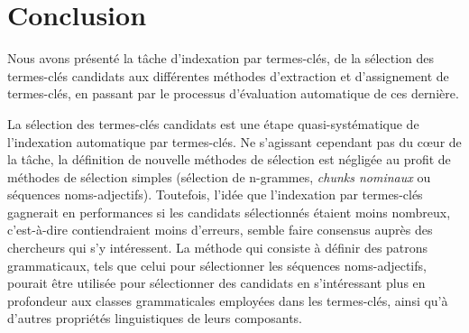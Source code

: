 


  \section{Conclusion}
  \label{sec:main-state_of_the_art-automatic_evaluation_of_keyphrase_annotation-conclusion}
    Nous avons présenté la tâche d'indexation par termes-clés, de la sélection
    des termes-clés candidats aux différentes méthodes d'extraction et
    d'assignement de termes-clés, en passant par le processus d'évaluation
    automatique de ces dernière.

    La sélection des termes-clés candidats est une étape quasi-systématique de
    l'indexation automatique par termes-clés. Ne s'agissant cependant pas du
    c\oe{}ur de la tâche, la définition de nouvelle méthodes de sélection est
    négligée au profit de méthodes de sélection simples (sélection de n-grammes,
    \textit{chunks nominaux} ou séquences noms-adjectifs). Toutefois, l'idée que
    l'indexation par termes-clés gagnerait en performances si les candidats
    sélectionnés étaient moins nombreux, c'est-à-dire contiendraient moins
    d'erreurs, semble faire consensus auprès des chercheurs qui s'y intéressent.
    La méthode qui consiste à définir des patrons grammaticaux, tels que celui
    pour sélectionner les séquences noms-adjectifs,  pourait être utilisée pour
    sélectionner des candidats en s'intéressant plus en profondeur aux classes
    grammaticales employées dans les termes-clés, ainsi qu'à d'autres propriétés
    linguistiques de leurs composants.

